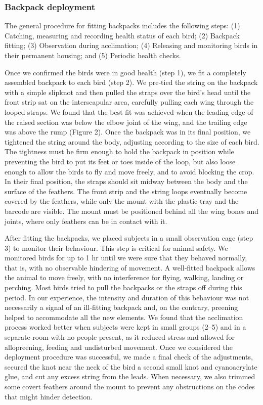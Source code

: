 \documentclass[11pt,a4paper,oneside]{book}
\begin{document}
\subsubsection{Backpack deployment}
The general procedure for fitting backpacks includes the following steps: (1) Catching, measuring and recording health status of each bird; (2) Backpack fitting; (3) Observation during acclimation; (4) Releasing and monitoring birds in their permanent housing; and (5) Periodic health checks.

Once we confirmed the birds were in good health (step 1), we fit a completely assembled backpack to each bird (step 2). We pre‐tied the string on the backpack with a simple slipknot and then pulled the straps over the bird's head until the front strip sat on the interscapular area, carefully pulling each wing through the looped straps. We found that the best fit was achieved when the leading edge of the raised section was below the elbow joint of the wing, and the trailing edge was above the rump (Figure 2). Once the backpack was in its final position, we tightened the string around the body, adjusting according to the size of each bird. The tightness must be firm enough to hold the backpack in position while preventing the bird to put its feet or toes inside of the loop, but also loose enough to allow the birds to fly and move freely, and to avoid blocking the crop. In their final position, the straps should sit midway between the body and the surface of the feathers. The front strip and the string loops eventually become covered by the feathers, while only the mount with the plastic tray and the barcode are visible. The mount must be positioned behind all the wing bones and joints, where only feathers can be in contact with it.

After fitting the backpacks, we placed subjects in a small observation cage (step 3) to monitor their behaviour. This step is critical for animal safety. We monitored birds for up to 1 hr until we were sure that they behaved normally, that is, with no observable hindering of movement. A well‐fitted backpack allows the animal to move freely, with no interference for flying, walking, landing or perching. Most birds tried to pull the backpacks or the straps off during this period. In our experience, the intensity and duration of this behaviour was not necessarily a signal of an ill‐fitting backpack and, on the contrary, preening helped to accommodate all the new elements. We found that the acclimation process worked better when subjects were kept in small groups (2–5) and in a separate room with no people present, as it reduced stress and allowed for allopreening, feeding and undisturbed movement. Once we considered the deployment procedure was successful, we made a final check of the adjustments, secured the knot near the neck of the bird a second small knot and cyanoacrylate glue, and cut any excess string from the leads. When necessary, we also trimmed some covert feathers around the mount to prevent any obstructions on the codes that might hinder detection.
\end{document}
